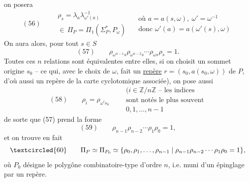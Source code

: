 on posera
\[
(56)\qquad
\begin{gathered}
\rho_s=\lambda_a\lambda_{\omega'(a)}^{-1}\\
\in\,\Pi_P=\Pi_1(\Sigma_P^*,P_\omega)
\end{gathered}
\quad
\begin{gathered}
\text{où }a=a(s,\omega),\ \omega'=\omega^{-1}\\
\text{donc }\omega'(a)=a(\omega'(s),\omega)
\end{gathered}
\]
On aura alors, pour tout $s\in S$
\[
(57)\qquad
\rho_{\omega^{n-1}s}\rho_{\omega^{n-2}s}\cdots\rho_{\omega s}\rho_s=1.
\]
Toutes ces $n$ relations sont équivalentes entre elles, si on choisit un sommet origine $s_0$ -- ce qui, avec le choix de $\omega$, fait un \uline{repère}  $r=(s_0,a(s_0,\omega))$ de $P$, d'où aussi un repère de la carte cyclotomique associée), on pose aussi
\[
(58)\qquad \rho_i=\rho_{\omega^i s_0}
\qquad
\begin{gathered}
(i\in\mathbb Z/n\mathbb Z\text{ -- les indices}\\
\text{sont notés le plus souvent}\\
0,1,\ldots,n-1
\end{gathered}
\]
de sorte que (57) prend la forme
\[
(59)\qquad \rho_{n-1}\rho_{n-2}\cdots\rho_1\rho_0=1,
\]
et on trouve en fait
\[
\textcircled{60}\qquad
\Pi_P\simeq\Pi_{P_0}\simeq
\{\rho_0,\rho_1,\ldots,\rho_{n-1}\mid
\rho_{n-1}\rho_{n-2}\cdots\rho_1\rho_0=1\},
\]
où $P_0$ désigne le polygône combinatoire-type d'ordre $n$, i.e. muni d'un épinglage par un repère.

